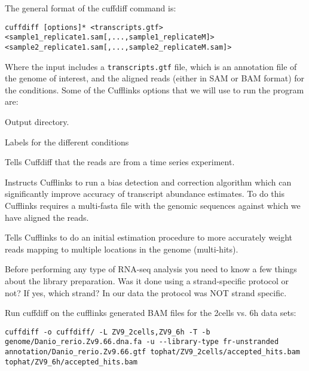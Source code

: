 \begin{information}
The general format of the cuffdiff command is:
\begin{lstlisting}[style=command_syntax]
cuffdiff [options]* <transcripts.gtf> <sample1_replicate1.sam[,...,sample1_replicateM]> <sample2_replicate1.sam[,...,sample2_replicateM.sam]>
\end{lstlisting}

Where the input includes a \texttt{transcripts.gtf} file, which is an annotation
file of the genome of interest, and the aligned reads (either in SAM or BAM
format) for the conditions.
Some of the Cufflinks options that we will use to run the program are:
\begin{description}[style=multiline,labelindent=0cm,align=right,leftmargin=\descriptionlabelspace,rightmargin=1.5cm,font=\ttfamily]
  \item[-o] Output directory.
  \item[-L] Labels for the different conditions
  \item[-T] Tells Cuffdiff that the reads are from a time series experiment.
  \item[-b] Instructs Cufflinks to run a bias detection and correction algorithm
  which can significantly improve accuracy of transcript abundance estimates.
  To do this Cufflinks requires a multi-fasta file with the genomic sequences
  against which we have aligned the reads.
  \item[-u] Tells Cufflinks to do an initial estimation procedure to more
  accurately weight reads mapping to multiple locations in the genome
  (multi-hits). 
  \item[--library-type] Before performing any type of RNA-seq analysis you need
 to know a few things about the library preparation. Was it done using a
 strand-specific protocol or not? If yes, which strand? In our data the protocol
 was NOT strand specific.
\end{description}
\end{information}

\begin{steps}
Run cuffdiff on the cufflinks generated BAM files for the 2cells vs. 6h data sets:
\begin{lstlisting}
cuffdiff -o cuffdiff/ -L ZV9_2cells,ZV9_6h -T -b genome/Danio_rerio.Zv9.66.dna.fa -u --library-type fr-unstranded annotation/Danio_rerio.Zv9.66.gtf tophat/ZV9_2cells/accepted_hits.bam tophat/ZV9_6h/accepted_hits.bam
\end{lstlisting}
\end{steps}

